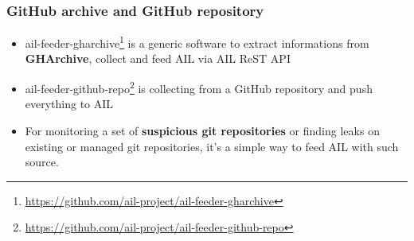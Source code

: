 \begin{frame}[fragile]
    \frametitle{GitHub archive and GitHub repository}
    \begin{itemize}
        \item ail-feeder-gharchive\footnote{\url{https://github.com/ail-project/ail-feeder-gharchive}} is a generic software to extract informations from {\bf GHArchive}, collect and feed AIL via AIL ReST API
        \item ail-feeder-github-repo\footnote{\url{https://github.com/ail-project/ail-feeder-github-repo}} is collecting from a GitHub repository and push everything to AIL
        \item For monitoring a set of {\bf suspicious git repositories} or finding leaks on existing or managed git repositories, it's a simple way to feed AIL with such source.
    \end{itemize}
\end{frame}

